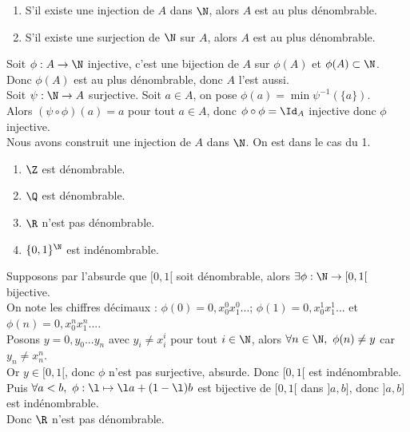 \documentclass[11pt]{article}
\begin{document}
\begin{lemme}{}{}
    \begin{enumerate}
        \item S'il existe une injection de $A$ dans $\N$, alors $A$ est au plus dénombrable.
        \item S'il existe une surjection de $\N$ sur $A$, alors $A$ est au plus dénombrable.
    \end{enumerate}
    \tcblower
     Soit $\phi:A\to\N$ injective, c'est une bijection de $A$ sur $\phi(A)$ et $\phi(A)\subset \N$.\\
    Donc $\phi(A)$ est au plus dénombrable, donc $A$ l'est aussi.\\
     Soit $\psi:\N\to A$ surjective. Soit $a\in A$, on pose $\phi(a)=\min\psi^{-1}(\{a\})$.\\
    Alors $(\psi\circ\phi)(a)=a$ pour tout $a\in A$, donc $\phi\circ\phi=\Id_A$ injective donc $\phi$ injective.\\
    Nous avons construit une injection de $A$ dans $\N$. On est dans le cas du 1.
\end{lemme}

\vspace*{-0.8cm}

\begin{prop}{}{}
    \begin{enumerate}
        \item $\Z$ est dénombrable.
        \item $\Q$ est dénombrable.
        \item $\R$ n'est pas dénombrable.
        \item $\{0,1\}^\N$ est indénombrable.
    \end{enumerate}
    \tcblower
     Supposons par l'absurde que $[0,1[$ soit dénombrable, alors $\exists \phi:\N\to[0,1[$ bijective.\\
    On note les chiffres décimaux : $\phi(0)=0,x_0^0x_1^0...$; $\phi(1)=0,x_0^1x_1^1...$ et $\phi(n)=0,x_0^nx_1^n...$.\\
    Posons $y=0,y_0...y_n$ avec $y_i\neq x_i^i$ pour tout $i\in\N$, alors $\forall n \in \N, ~ \phi(n)\neq y$ car $y_n\neq x_n^n$.\\
    Or $y\in[0,1[$, donc $\phi$ n'est pas surjective, absurde. Donc $[0,1[$ est indénombrable.\\
    Puis $\forall a<b, ~ \phi:\l\mapsto \l a + (1-\l)b$ est bijective de $[0,1[$ dans $]a,b]$, donc $]a,b]$ est indénombrable.\\
    Donc $\R$ n'est pas dénombrable.
\end{prop}
\end{document}
